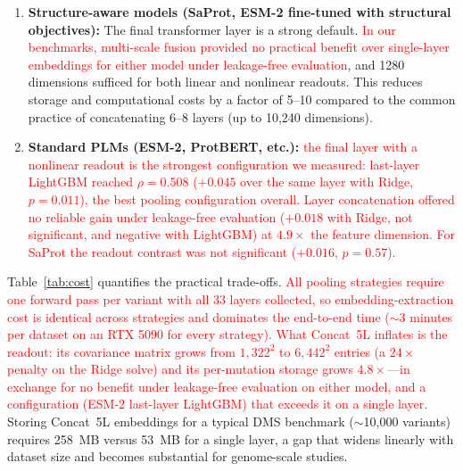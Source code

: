 \documentclass[numbered,webpdf,modern,large]{oup-authoring-template}
\newcommand{\rev}[1]{\textcolor{red}{#1}}
\begin{document}
\begin{enumerate}
    \item \textbf{Structure-aware models (SaProt, ESM-2 fine-tuned with structural
    objectives):} The final transformer layer is a strong default. \rev{In our
    benchmarks, multi-scale fusion provided no practical benefit over single-layer
    embeddings for either model under leakage-free evaluation}, and 1280 dimensions
    sufficed for both linear and nonlinear readouts.
    This reduces
    storage and computational costs by a factor of 5--10 compared to the common
    practice of concatenating 6--8 layers (up to 10,240 dimensions).

    \item \textbf{Standard PLMs (ESM-2, ProtBERT, etc.):} \rev{the final layer
    with a nonlinear readout is the strongest configuration we measured:
    last-layer LightGBM reached $\rho = 0.508$ ($+0.045$ over the same layer
    with Ridge, $p = 0.011$), the best pooling configuration overall. Layer
    concatenation offered no reliable gain under leakage-free evaluation
    ($+0.018$ with Ridge, not significant, and negative with LightGBM) at
    $4.9\times$ the feature dimension. For SaProt the readout contrast was not
    significant ($+0.016$, $p = 0.57$).}
\end{enumerate}

Table~\ref{tab:cost} quantifies the practical trade-offs. \rev{All pooling
strategies require one forward pass per variant with all 33 layers collected,
so embedding-extraction cost is identical across strategies and dominates the
end-to-end time ($\sim$3 minutes per dataset on an RTX 5090 for every
strategy). What Concat~5L inflates is the readout: its covariance matrix
grows from $1{,}322^2$ to $6{,}442^2$ entries (a $24\times$ penalty on the
Ridge solve) and its per-mutation storage grows $4.8\times$---in exchange for
no benefit under leakage-free evaluation on
either model, and a configuration (ESM-2 last-layer LightGBM) that exceeds it
on a single layer.} Storing Concat~5L embeddings for a typical DMS
benchmark ($\sim$10,000 variants) requires 258~MB versus 53~MB for a single
layer, a gap that widens linearly with dataset size and becomes substantial
for genome-scale studies.
\end{document}
